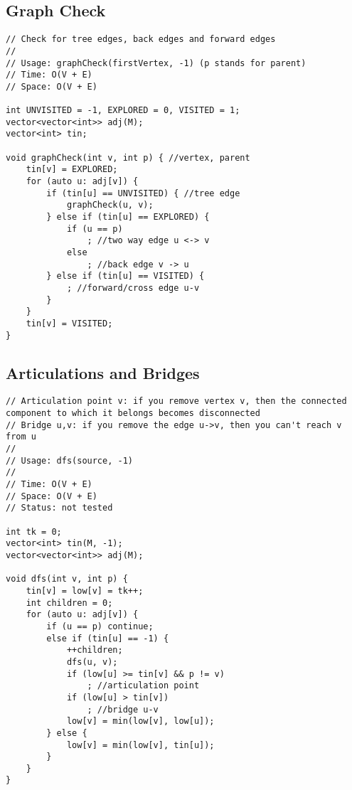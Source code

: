 \documentclass[12pt, a4paper, twoside]{article}
\begin{document}
\subsection{Graph Check}
\begin{lstlisting}
// Check for tree edges, back edges and forward edges
//
// Usage: graphCheck(firstVertex, -1) (p stands for parent)
// Time: O(V + E)
// Space: O(V + E)

int UNVISITED = -1, EXPLORED = 0, VISITED = 1;
vector<vector<int>> adj(M);
vector<int> tin;

void graphCheck(int v, int p) { //vertex, parent
	tin[v] = EXPLORED;
	for (auto u: adj[v]) {
		if (tin[u] == UNVISITED) { //tree edge
			graphCheck(u, v);
		} else if (tin[u] == EXPLORED) {
			if (u == p)
				; //two way edge u <-> v
			else
				; //back edge v -> u
		} else if (tin[u] == VISITED) {
			; //forward/cross edge u-v
		}
	}
	tin[v] = VISITED;
}
\end{lstlisting}

\subsection{Articulations and Bridges}
\begin{lstlisting}
// Articulation point v: if you remove vertex v, then the connected component to which it belongs becomes disconnected
// Bridge u,v: if you remove the edge u->v, then you can't reach v from u
//
// Usage: dfs(source, -1)
//
// Time: O(V + E)
// Space: O(V + E)
// Status: not tested

int tk = 0;
vector<int> tin(M, -1);
vector<vector<int>> adj(M);

void dfs(int v, int p) {
	tin[v] = low[v] = tk++;
	int children = 0;
	for (auto u: adj[v]) {
		if (u == p) continue;
		else if	(tin[u] == -1) {
			++children;
			dfs(u, v);
			if (low[u] >= tin[v] && p != v)
				; //articulation point
			if (low[u] > tin[v])
				; //bridge u-v
			low[v] = min(low[v], low[u]);
		} else {
			low[v] = min(low[v], tin[u]);
		}
	}
}
\end{lstlisting}
\end{document}
